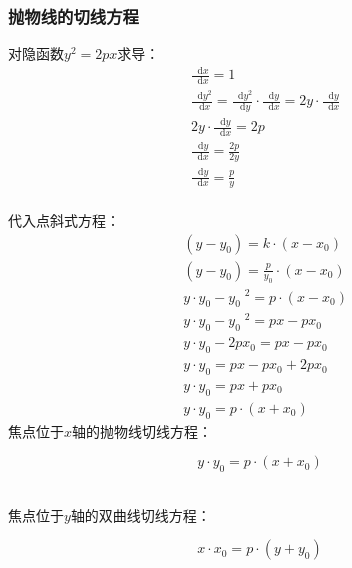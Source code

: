 \documentclass[UTF8]{ctexart}
\newcommand*{\dif}{\mathop{}\!\mathrm{d}}
\begin{document}
\newpage

\subsubsection{抛物线的切线方程}
    对隐函数$y^2=2px$求导：
    \setcounter{equation}{0}
    \begin{align}
        &\frac{\dif x}{\dif x}=1\\[4mm]
        &\frac{\dif y^2}{\dif x}=\frac{\dif y^2}{\dif y}\cdot\frac{\dif y}{\dif x}=2y\cdot\frac{\dif y}{\dif x}\\[6mm]
        &2y\cdot\frac{\dif y}{\dif x}=2p\\[4mm]
        &\frac{\dif y}{\dif x}=\frac{2p}{2y}\\[4mm]
        &\frac{\dif y}{\dif x}=\frac{p}{y}
    \end{align}\\
    代入点斜式方程：
    \begin{align}
        &(y-y_0)=k\cdot(x-x_0)\\[4mm]
        &(y-y_0)=\frac{p}{y_0}\cdot(x-x_0)\\[4mm]
        &y\cdot y_0-y_0\;^2=p\cdot(x-x_0)\\[4mm]
        &y\cdot y_0-y_0\;^2=px-px_0\\[4mm]
        &y\cdot y_0-2px_0=px-px_0\\[4mm]
        &y\cdot y_0=px-px_0+2px_0\\[4mm]
        &y\cdot y_0=px+px_0\\[4mm]
        &y\cdot y_0=p\cdot(x+x_0)
    \end{align}\vspace{3pt}
    焦点位于$x$轴的抛物线切线方程：
    \begin{large}
        \begin{equation*}
            y\cdot y_0=p\cdot(x+x_0)
        \end{equation*}
    \end{large}\\
    焦点位于$y$轴的双曲线切线方程：
    \begin{large}
        \begin{equation*}
            x\cdot x_0=p\cdot(y+y_0)
        \end{equation*}
    \end{large}

\newpage
\end{document}
